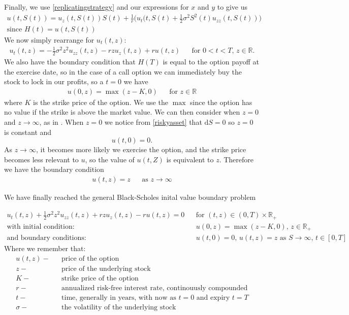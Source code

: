 \documentclass[11pt]{article} %
\begin{document}
Finally, we use \ref{replicatingstrategy} and our expressions for $x$ and $y$ to give us
\begin{align}
    u(t,S(t)) = u_z(t,S(t))S(t) + \frac{1}{r}\bigg(u_t(t,S(t) + \frac{1}{2}\sigma^2S^2(t)
    u_{zz}(t,S(t))\bigg) \\\text{since $H(t) = u(t,S(t))$}
\end{align}
We now simply rearrange for $u_t(t,z)$:
\begin{align}\label{blackscholes}
    u_t(t,z) = -\frac{1}{2}\sigma^2z^2u_{zz}(t,z) - rzu_z(t,z) + ru(t,z) 
   && \text{for $0<t<T$, $z \in \mathbb{R}$.}
\end{align}
We also have the boundary condition that $H(T)$ is equal to the option payoff at the exercise 
date, so in the case of a call option we can immediately buy the stock to lock in our profits, 
so a $t=0$ we have
\begin{align} \label{initialvalue}
    u(0,z) = \max{(z - K , 0)} && \text{for $z \in \mathbb{R}$}
\end{align}
where $K$ is the strike price of the option. We use the $\max$ since the option has no value 
if the strike is above the market value. We can then consider when $z=0$ and 
$z \to \infty$, as in \cite{scholesapplication}. When $z=0$ we notice from \ref{riskyasset} 
that $\mathrm{d}S = 0$ so $z = 0$ is constant and
\begin{equation} \label{boundarycondition}
    u(t,0) = 0.
\end{equation}
As $z \to \infty$, it becomes more likely we exercise the option, and the strike price 
becomes less relevant to $u$, so the value of $u(t,Z)$ is equivalent to $z$. Therefore 
we have the boundary condition 
\begin{align} 
    u(t,z) = z && \text{as $z \to \infty$}
\end{align}

We have finally reached the general Black-Scholes inital value boundary problem

\begin{align}
    u_t(t,z) +\frac{1}{2}\sigma^2z^2u_{zz}(t,z) + rzu_z(t,z) - ru(t,z) = 0 &&
    \text{for $(t,z) \in (0,T) \times \mathbb{R}_+ $}\\
    \text{with initial condition: } && u(0,z) = \max{(z-K, 0)} \text{, } 
    z \in \mathbb{R}_+ \\
    \text{and boundary conditions: } && u(t, 0) = 0 \text{,  $u(t,z) = z$ as 
    $S \to \infty $,  $t \in [0,T]$}
\end{align}
Where we remember that: 
\begin{align}
    u(t,z) - && \text{price of the option}\\
    z - && \text{price of the underlying stock}\\
    K - && \text{strike price of the option}\\
    r - && \text{annualized risk-free interest rate, continouusly compounded}\\
    t - && \text{time, generally in years, with now as $t=0$ and expiry $t=T$}\\
    \sigma - && \text{the volatility of the underlying stock}
\end{align}
\end{document}
